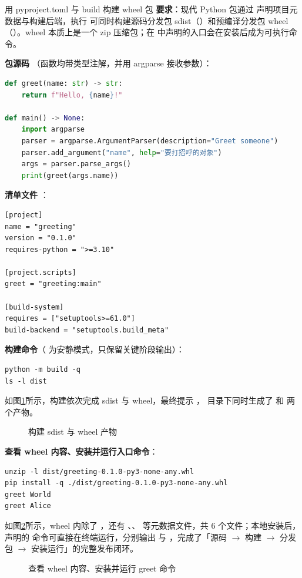 \begin{exercise}{用 pyproject.toml 与 build 构建 wheel 包}
\textbf{要求}：现代 Python 包通过  声明项目元数据与构建后端，执行  可同时构建源码分发包 sdist（）和预编译分发包 wheel（）。wheel 本质上是一个 zip 压缩包；在  中声明的入口会在安装后成为可执行命令。

\textbf{包源码 }（函数均带类型注解，并用 argparse 接收参数）：
\begin{lstlisting}[language=Python]
def greet(name: str) -> str:
    return f"Hello, {name}!"

def main() -> None:
    import argparse
    parser = argparse.ArgumentParser(description="Greet someone")
    parser.add_argument("name", help="要打招呼的对象")
    args = parser.parse_args()
    print(greet(args.name))
\end{lstlisting}

\textbf{清单文件 }：
\begin{lstlisting}
[project]
name = "greeting"
version = "0.1.0"
requires-python = ">=3.10"

[project.scripts]
greet = "greeting:main"

[build-system]
requires = ["setuptools>=61.0"]
build-backend = "setuptools.build_meta"
\end{lstlisting}

\textbf{构建命令}（ 为安静模式，只保留关键阶段输出）：
\begin{lstlisting}
python -m build -q
ls -l dist
\end{lstlisting}

如图\ref{fig:ms2-03a}所示，构建依次完成 sdist 与 wheel，最终提示 ， 目录下同时生成了  和  两个产物。

\begin{figure}[H]
    \centering
    \caption{构建 sdist 与 wheel 产物}
    \label{fig:ms2-03a}
\end{figure}

\textbf{查看 wheel 内容、安装并运行入口命令}：
\begin{lstlisting}
unzip -l dist/greeting-0.1.0-py3-none-any.whl
pip install -q ./dist/greeting-0.1.0-py3-none-any.whl
greet World
greet Alice
\end{lstlisting}

如图\ref{fig:ms2-03b}所示，wheel 内除了 ，还有 、、 等元数据文件，共 6 个文件；本地安装后， 声明的  命令可直接在终端运行，分别输出  与 ，完成了「源码 $\rightarrow$ 构建 $\rightarrow$ 分发包 $\rightarrow$ 安装运行」的完整发布闭环。

\begin{figure}[H]
    \centering
    \caption{查看 wheel 内容、安装并运行 greet 命令}
    \label{fig:ms2-03b}
\end{figure}
\end{exercise}

